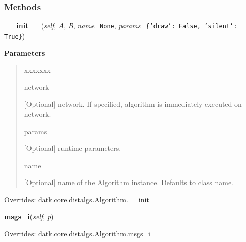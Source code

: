   \subsubsection{Methods}

    \vspace{0.5ex}

\hspace{.8\funcindent}\begin{boxedminipage}{\funcwidth}

    \raggedright \textbf{\_\_init\_\_}(\textit{self}, \textit{A}, \textit{B}, \textit{name}={\tt None}, \textit{params}={\tt \texttt{\{}\texttt{'}\texttt{draw}\texttt{'}\texttt{: }False\texttt{, }\texttt{'}\texttt{silent}\texttt{'}\texttt{: }True\texttt{\}}})

\setlength{\parskip}{2ex}
\setlength{\parskip}{1ex}
      \textbf{Parameters}
      \vspace{-1ex}

      \begin{quote}
        \begin{Ventry}{xxxxxxx}

          \item[network]

          [Optional] network. If specified, algorithm is immediately 
          executed on network.

          \item[params]

          [Optional] runtime parameters.

          \item[name]

          [Optional] name of the Algorithm instance. Defaults to class 
          name.

        \end{Ventry}

      \end{quote}

      Overrides: datk.core.distalgs.Algorithm.\_\_init\_\_

    \end{boxedminipage}

    \vspace{0.5ex}

\hspace{.8\funcindent}\begin{boxedminipage}{\funcwidth}

    \raggedright \textbf{msgs\_i}(\textit{self}, \textit{p})

\setlength{\parskip}{2ex}
\setlength{\parskip}{1ex}
      Overrides: datk.core.distalgs.Algorithm.msgs\_i

    \end{boxedminipage}


